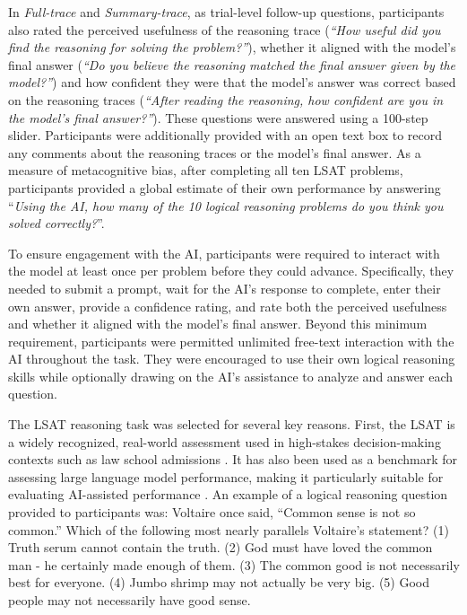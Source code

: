\documentclass[acmlarge,review=true, anonymous=true]{acmart}
\begin{document}
In \textit{Full-trace} and \textit{Summary-trace}, as trial-level follow-up questions, participants also rated the perceived usefulness of the reasoning trace (\textit{``How useful did you find the reasoning for solving the problem?''}), whether it aligned with the model's final answer (\textit{``Do you believe the reasoning matched the final answer given by the model?''}) and how confident they were that the model's answer was correct based on the reasoning traces (\textit{``After reading the reasoning, how confident are you in the model’s final answer?''}). These questions were answered using a 100-step slider. Participants were additionally provided with an open text box to record any comments about the reasoning traces or the model's final answer. As a measure of metacognitive bias,  after completing all ten LSAT problems, participants provided a global estimate of their own performance by answering ``\textit{Using the AI, how many of the 10 logical reasoning problems do you think you solved correctly?}''. 

To ensure engagement with the AI, participants were required to interact with the model at least once per problem before they could advance. Specifically, they needed to submit a prompt, wait for the AI's response to complete, enter their own answer, provide a confidence rating, and rate both the perceived usefulness and whether it aligned with the model's final answer. 
Beyond this minimum requirement, participants were permitted unlimited free-text interaction with the AI throughout the task. They were encouraged to use their own logical reasoning skills while optionally drawing on the AI's assistance to analyze and answer each question.

The LSAT reasoning task was selected for several key reasons. First, the LSAT is a widely recognized, real-world assessment used in high-stakes decision-making contexts such as law school admissions \cite{shultz2011predicting,wainer1995precision}. It has also been used as a benchmark for assessing large language model performance, making it particularly suitable for evaluating AI-assisted performance \cite{katz2024gpt}. An example of a logical reasoning question provided to participants was: Voltaire once said, ``Common sense is not so common.'' Which of the following most nearly parallels Voltaire’s statement? (1) Truth serum cannot contain the truth. (2) God must have loved the common man - he certainly made enough of them. (3) The common good is not necessarily best for everyone. (4) Jumbo shrimp may not actually be very big. (5) Good people may not necessarily have good sense.
\end{document}
